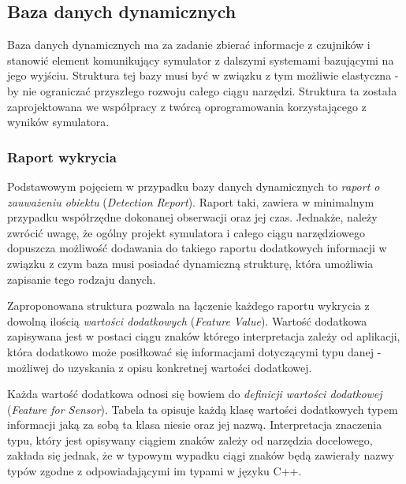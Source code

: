 {\subsection{Baza danych dynamicznych}
\par{
Baza danych dynamicznych ma za zadanie zbierać informacje z czujników i stanowić element komunikujący symulator z dalszymi systemami bazującymi na jego wyjściu. Struktura tej bazy musi być w związku z tym możliwie elastyczna - by nie ograniczać przyszłego rozwoju całego ciągu narzędzi. Struktura ta została zaprojektowana we współpracy z twórcą oprogramowania korzystającego z wyników symulatora.
}
\subsubsection{Raport wykrycia}
\par{
Podstawowym pojęciem w przypadku bazy danych dynamicznych to \textit{raport o zauważeniu obiektu} (\textit{Detection Report}). Raport taki, zawiera w minimalnym przypadku współrzędne dokonanej obserwacji oraz jej czas. Jednakże, należy zwrócić uwagę, że ogólny projekt symulatora i całego ciągu narzędziowego dopuszcza możliwość dodawania do takiego raportu dodatkowych informacji w związku z czym baza musi posiadać dynamiczną strukturę, która umożliwia zapisanie tego rodzaju danych.
}
\par{
Zaproponowana struktura pozwala na łączenie każdego raportu wykrycia z dowolną ilością \textit{wartości dodatkowych} (\textit{Feature Value}). Wartość dodatkowa  zapisywana jest w postaci ciągu znaków którego interpretacja zależy od aplikacji, która dodatkowo może posiłkować się informacjami dotyczącymi typu danej - możliwej do uzyskania z opisu konkretnej wartości dodatkowej.
}
\par{
Każda wartość dodatkowa odnosi się bowiem do \textit{definicji wartości dodatkowej} (\textit{Feature for Sensor}). Tabela ta opisuje każdą klasę wartości dodatkowych typem informacji jaką za sobą ta klasa niesie oraz jej nazwą. Interpretacja znaczenia typu, który jest opisywany ciągiem znaków zależy od narzędzia docelowego, zakłada się jednak, że w typowym wypadku ciągi znaków będą zawierały nazwy typów zgodne z odpowiadającymi im typami w języku C++.
}
}
